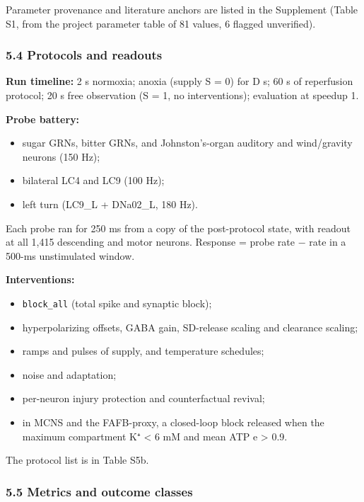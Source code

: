 \documentclass[11pt]{article}
\providecommand{\tightlist}{\setlength{\itemsep}{0pt}\setlength{\parskip}{0pt}}
\begin{document}
Parameter provenance and literature anchors are listed in the Supplement (Table S1, from the project parameter table of 81 values, 6 flagged unverified).

\subsubsection{5.4 Protocols and readouts}\label{protocols-and-readouts}

\textbf{Run timeline:} 2 s normoxia; anoxia (supply S = 0) for D s; 60 s of reperfusion protocol; 20 s free observation (S = 1, no interventions); evaluation at speedup 1.

\textbf{Probe battery:}

\begin{itemize}
\tightlist
\item
  sugar GRNs, bitter GRNs, and Johnston's-organ auditory and wind/gravity neurons (150 Hz);
\item
  bilateral LC4 and LC9 (100 Hz);
\item
  left turn (LC9\_L + DNa02\_L, 180 Hz).
\end{itemize}

Each probe ran for 250 ms from a copy of the post-protocol state, with readout at all 1,415 descending and motor neurons. Response = probe rate − rate in a 500-ms unstimulated window.

\textbf{Interventions:}

\begin{itemize}
\tightlist
\item
  \texttt{block\_all} (total spike and synaptic block);
\item
  hyperpolarizing offsets, GABA gain, SD-release scaling and clearance scaling;
\item
  ramps and pulses of supply, and temperature schedules;
\item
  noise and adaptation;
\item
  per-neuron injury protection and counterfactual revival;
\item
  in MCNS and the FAFB-proxy, a closed-loop block released when the maximum compartment K⁺ \textless{} 6 mM and mean ATP e \textgreater{} 0.9.
\end{itemize}

The protocol list is in Table S5b.

\subsubsection{5.5 Metrics and outcome classes}\label{metrics-and-outcome-classes}
\end{document}
